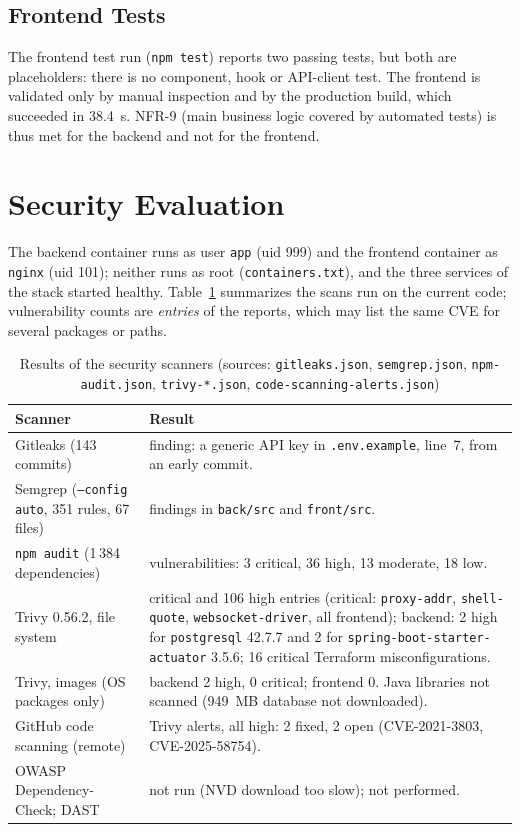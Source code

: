 \subsection{Frontend Tests}

The frontend test run (\texttt{npm test}) reports two passing tests, but both are placeholders: there is no component, hook or API-client test. The frontend is validated only by manual inspection and by the production build, which succeeded in 38.4~s. NFR-9 (main business logic covered by automated tests) is thus met for the backend and not for the frontend.

\section{Security Evaluation}\label{sec:res-security}

The backend container runs as user \texttt{app} (uid 999) and the frontend container as \texttt{nginx} (uid 101); neither runs as root (\texttt{containers.txt}), and the three services of the stack started healthy. Table~\ref{tab:scans} summarizes the scans run on the current code; vulnerability counts are \emph{entries} of the reports, which may list the same CVE for several packages or paths.

\begin{table}[H]
\centering\small
\caption{Results of the security scanners (sources: \texttt{gitleaks.json}, \texttt{semgrep.json}, \texttt{npm-audit.json}, \texttt{trivy-*.json}, \texttt{code-scanning-alerts.json})}\label{tab:scans}
\begin{tabularx}{\linewidth}{@{}>{\raggedright\arraybackslash}p{2.7cm}>{\raggedright\arraybackslash}X@{}}
\toprule
\textbf{Scanner} & \textbf{Result} \\
\midrule
Gitleaks (143 commits) & 1 finding: a generic API key in \texttt{.env.example}, line~7, from an early commit. \\
Semgrep (\texttt{--config auto}, 351 rules, 67 files) & 0 findings in \texttt{back/src} and \texttt{front/src}. \\
\texttt{npm audit} (1\,384 dependencies) & 70 vulnerabilities: 3 critical, 36 high, 13 moderate, 18 low. \\
Trivy 0.56.2, file system & 3 critical and 106 high entries (critical: \texttt{proxy-addr}, \texttt{shell-quote}, \texttt{websocket-driver}, all frontend); backend: 2 high for \texttt{postgresql} 42.7.7 and 2 for \texttt{spring-boot-starter-actuator} 3.5.6; 16 critical Terraform misconfigurations. \\
Trivy, images (OS packages only) & backend 2 high, 0 critical; frontend 0. Java libraries not scanned (949~MB database not downloaded). \\
GitHub code scanning (remote) & 4 Trivy alerts, all high: 2 fixed, 2 open (CVE-2021-3803, CVE-2025-58754). \\
OWASP Dependency-Check; DAST & not run (NVD download too slow); not performed. \\
\bottomrule
\end{tabularx}
\end{table}

